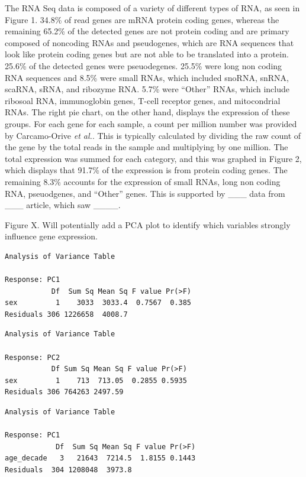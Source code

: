 \documentclass[
  letterpaper,
  DIV=11,
  numbers=noendperiod]{scrartcl}
\begin{document}
The RNA Seq data is composed of a variety of different types of RNA, as
seen in Figure 1. 34.8\% of read genes are mRNA protein coding genes,
whereas the remaining 65.2\% of the detected genes are not protein
coding and are primary composed of noncoding RNAs and pseudogenes, which
are RNA sequences that look like protein coding genes but are not able
to be translated into a protein. 25.6\% of the detected genes were
pseuodegenes. 25.5\% were long non coding RNA sequences and 8.5\% were
small RNAs, which included snoRNA, snRNA, scaRNA, sRNA, and ribozyme
RNA. 5.7\% were ``Other'' RNAs, which include ribosoal RNA, immunoglobin
genes, T-cell receptor genes, and mitocondrial RNAs. The right pie
chart, on the other hand, displays the expression of these groups. For
each gene for each sample, a count per million number was provided by
Carcamo-Orive \emph{et al.}. This is typically calculated by dividing
the raw count of the gene by the total reads in the sample and
multiplying by one million. The total expression was summed for each
category, and this was graphed in Figure 2, which displays that 91.7\%
of the expression is from protein coding genes. The remaining 8.3\%
accounts for the expression of small RNAs, long non coding RNA,
pseuodgenes, and ``Other'' genes. This is supported by \_\_\_ data from
\_\_\_ article, which saw \_\_\_\_.

Figure X. Will potentially add a PCA plot to identify which variables
strongly influence gene expression.

\begin{verbatim}
Analysis of Variance Table

Response: PC1
           Df  Sum Sq Mean Sq F value Pr(>F)
sex         1    3033  3033.4  0.7567  0.385
Residuals 306 1226658  4008.7               
\end{verbatim}

\begin{verbatim}
Analysis of Variance Table

Response: PC2
           Df Sum Sq Mean Sq F value Pr(>F)
sex         1    713  713.05  0.2855 0.5935
Residuals 306 764263 2497.59               
\end{verbatim}

\begin{verbatim}
Analysis of Variance Table

Response: PC1
            Df  Sum Sq Mean Sq F value Pr(>F)
age_decade   3   21643  7214.5  1.8155 0.1443
Residuals  304 1208048  3973.8               
\end{verbatim}
\end{document}
